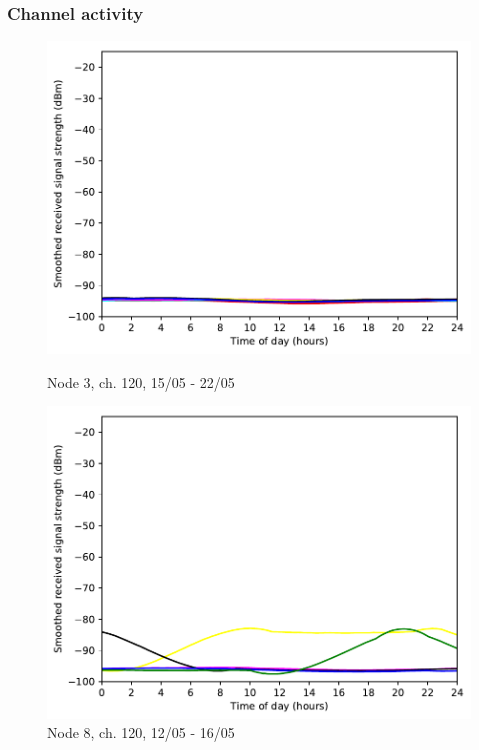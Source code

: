 \documentclass[a4paper, 11pt]{article}
\begin{document}
\subsubsection{Channel activity}
\begin{figure}[ht]
\begin{minipage}{0.47\textwidth}
	\centering
	\includegraphics[width=\textwidth]{images/5_GHz/cot-node3-student_2017-05-22_chan100_image.pdf}
	\caption{Node 3, ch. 120, 15/05 - 22/05}
	\label{node3_5ghz_traffic_chan100}
\end{minipage}\hfill
\begin{minipage}{0.47\textwidth}
	\centering
	\includegraphics[width=\textwidth]{images/5_GHz/cot-node8-student_2017-05-16_chan120_image.pdf}
	\caption{Node 8, ch. 120, 12/05 - 16/05}
	\label{node8_5ghz_traffic_chan120}
\end{minipage}\hfill
\end{figure}
\end{document}
